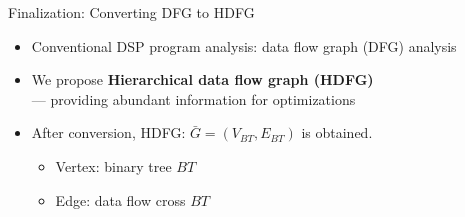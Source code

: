\documentclass{beamer}
\begin{document}
\begin{CJK}{UTF8}{bkai}
    \begin{frame}{Finalization: Converting DFG to HDFG}
        \begin{itemize}
            \item Conventional DSP program analysis: data flow graph (DFG) analysis
            \item We propose \textbf{Hierarchical data flow graph (HDFG)} \\
                    --- providing abundant information for optimizations
            \item After conversion, HDFG: $\bar{G} = (V_{BT}, E_{BT})$ is obtained.
                \begin{itemize}
                    \item Vertex: binary tree $BT$
                    \item Edge: data flow cross $BT$
                \end{itemize}
        \end{itemize}
        \begin{figure}[!ht]
            \begin{center}
\end{center}
\end{figure}
\end{frame}
\end{CJK}
\end{document}
